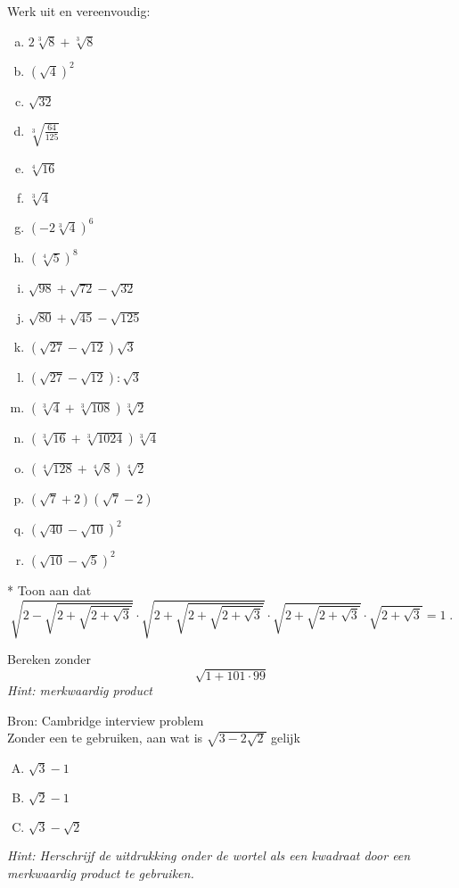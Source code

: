 \documentclass[12pt,twoside]{article}
\begin{document}
\begin{oefening}
Werk uit en vereenvoudig:
\begin{multicols}{3}
\begin{enumerate}[(a)]
  \itemsep.5em
  \item $2\sqrt[3]{8}+\sqrt[3]{8}$
  \item $\left(\sqrt{4}\right)^2$
  \item $\sqrt{32}$
  \item $\sqrt[3]{\frac{64}{125}}$
  \item $\sqrt[4]{16}$
  \item $\sqrt[3]{4}$
  \item $\left(-2\sqrt[3]{4}\right)^6$
  \item $\left(\sqrt[4]{5}\right)^8$
  \item $\sqrt{98}+\sqrt{72}-\sqrt{32}$
  \item $\sqrt{80}+\sqrt{45}-\sqrt{125}$
  \item $\left(\sqrt{27}-\sqrt{12}\right)\sqrt{3}$
  \item $\left(\sqrt{27}-\sqrt{12}\right):\sqrt{3}$
  \item $\left(\sqrt[3]{4}+\sqrt[3]{108}\right)\sqrt[3]{2}$
  \item $\left(\sqrt[3]{16}+\sqrt[3]{1024}\right)\sqrt[3]{4}$
  \item $\left(\sqrt[4]{128}+\sqrt[4]{8}\right)\sqrt[4]{2}$
  \item $\left(\sqrt{7}+2\right)\left(\sqrt{7}-2\right)$
  \item $\left(\sqrt{40}-\sqrt{10}\right)^2$
  \item $\left(\sqrt{10}-\sqrt{5}\right)^2$
\end{enumerate}
\end{multicols}
\end{oefening}

\begin{oefening}*
Toon aan dat
$$\sqrt{2-\sqrt{2+\sqrt{2+\sqrt{3}}}}\cdot\sqrt{2+\sqrt{2+\sqrt{2+\sqrt{3}}}}\cdot\sqrt{2+\sqrt{2+\sqrt{3}}}\cdot\sqrt{2+\sqrt{3}} = 1\;.$$
\end{oefening}

\begin{oefening}
Bereken zonder 
$$\sqrt{1+101\cdot99}$$
{\em Hint: merkwaardig product}
\end{oefening}

\begin{oefening}{\scriptsize Bron: Cambridge interview problem}\\
  Zonder een  te gebruiken, aan wat is  $\displaystyle\sqrt{3 - 2\sqrt{2}}$  gelijk
  \begin{enumerate}[(A)]
  \item $\sqrt{3}-1$
  \item $\sqrt{2}-1$
  \item $\sqrt{3}-\sqrt{2}$
  \end{enumerate}
  {\em Hint: Herschrijf de uitdrukking onder de wortel als een kwadraat door een merkwaardig product te gebruiken.}
\end{oefening}
\end{document}
